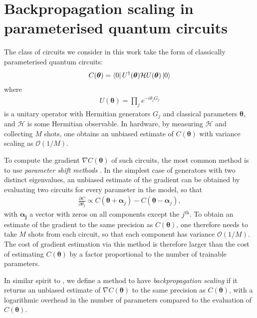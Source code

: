 \documentclass[twocolumn]{revtex4-2}
\renewcommand{\vec}{\boldsymbol}
\begin{document}
\section{Backpropagation scaling in parameterised quantum circuits}
The class of circuits we consider in this work take the form of classically parameterised quantum circuits:
%
\begin{align}\label{pqc}
    C(\vec{\theta}) = \bra{0}U^\dagger(\vec{\theta})\mathcal{H}U(\vec{\theta})\ket{0}
\end{align}
%
where 
%
\begin{align}
U(\vec{\theta})=\prod_j e^{-i\theta_jG_j}
\end{align}
%
is a unitary operator with Hermitian generators $G_j$ and classical parameters $\vec{\theta}$, and $\mathcal{H}$ is some Hermitian observable. In hardware, by measuring $\mathcal{H}$ and collecting $M$ shots, one obtains an unbiased estimate of $C(\vec{\theta})$ with variance scaling as $\mathcal{O}(1/M)$. 

To compute the gradient $\nabla C(\vec{\theta})$ of such circuits, the most common method is to use \emph{parameter shift methods} \cite{PS0, PS1, PS2, PS3, PS4, PS5}. In the simplest case of generators with two distinct eigenvalues, an unbiased estimate of the gradient can be obtained by evaluating two circuits for every parameter in the model, so that 
\begin{align}
\frac{\partial C}{\partial \theta_j}\propto C(\vec{\theta}+\vec{\alpha}_j)-C(\vec{\theta}-\vec{\alpha}_j),
\end{align}
with $\vec{\alpha_j}$ a vector with zeros on all components except the $j^{\text{th}}$. To obtain an estimate of the gradient to the same precision as $C(\vec{\theta})$, one therefore needs to take $M$ shots from each circuit, so that each component has variance  $\mathcal{O}(1/M)$. The cost of gradient estimation via this method is therefore larger than the cost of estimating $C(\vec{\theta})$ by a factor proportional to the number of trainable parameters. 

In similar spirit to \cite{abbas2023quantum}, we define a method to have \emph{backpropagation scaling} if it returns an unbiased estimate of $\nabla C(\vec{\theta})$ to the same precision as $C(\vec{\theta})$, 
with a logarithmic overhead in the number of parameters compared to the evaluation of $C(\vec{\theta})$. 
\end{document}
